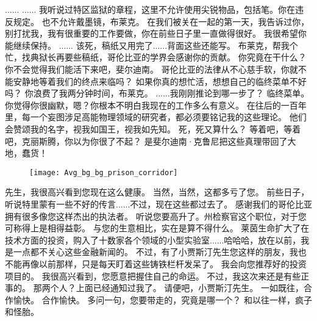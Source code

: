 \documentclass[openany]{book}
\begin{document}
\begin{dialogue}
     ......
     ......
     我听说过特区监狱的章程，这里不允许使用尖锐物品，包括笔。你在违反规定。
     也不允许戴墨镜，布莱克。
     在我们被关在一起的第一天，我告诉过你，别打扰我，我有很重要的工作要做，你在前些日子里一直做得很好。
     我很希望你能继续保持。
     ......
     该死，稿纸又用完了......背面这些还能写。
     布莱克，帮我个忙，找典狱长再要些稿纸，哥伦比亚的学界会感谢你的贡献。
     你究竟在干什么？
     你不会觉得我们能活下来吧，斐尔迪南。
     哥伦比亚的法律从不心慈手软，你就不能安静地等着我们的终点来临吗？
     如果你真的想忙活，想想自己的临终菜单不好吗？
     你浪费了我两分钟时间，布莱克。
     ......我刚刚推论到哪一步了？
     临终菜单。
     你觉得你很幽默，嗯？你根本不明白我现在的工作多么有意义。
     在往后的一百年里，每一个妄图涉足高能物理领域的研究者，都必须要铭记我的这些理论。
     他们会赞颂我的名字，视我如国王，视我如先知。
     死，死又算什么？
     等着吧，等着吧，克丽斯腾，你以为你很了不起？
     是斐尔迪南·克鲁尼把这些真理带回了大地，蠢货！
    \begin{figure}[h]
        \centering
        \texttt{[image: Avg\_bg\_bg\_prison\_corridor]}
    \end{figure}
     先生，我很高兴看到您现在这么健康。
     当然，当然，这都多亏了您。
     前些日子，听说特里蒙有一些不好的传言......不过，现在这些都过去了。
     感谢我们的哥伦比亚拥有很多像您这样杰出的执法者。
     听说您要高升了。州检察官这个职位，对于您可称得上是相得益彰。
     与您的生意相比，实在是算不得什么。
     莱茵生命扩大了在技术方面的投资，购入了十数家各个领域的小型实验室......哈哈哈，放在以前，我是一点都不关心这些金融新闻的。
     不过，有了小贾斯汀先生您这样的朋友，我也不能再像以前那样，只是每天盯着这些铸铁栏杆发呆了。
     我会向您推荐好的投资项目的。
     我很高兴看到，您愿意把握住自己的命运。
     不过，我这次来还是有些正事的。
     那两个人？上面已经通知过我了。
     请便吧，小贾斯汀先生。
     一如既往，合作愉快。
     合作愉快。
     多问一句，您要带走的，究竟是哪一个？
     和以往一样，疯子和怪胎。
\end{dialogue}
\end{document}
